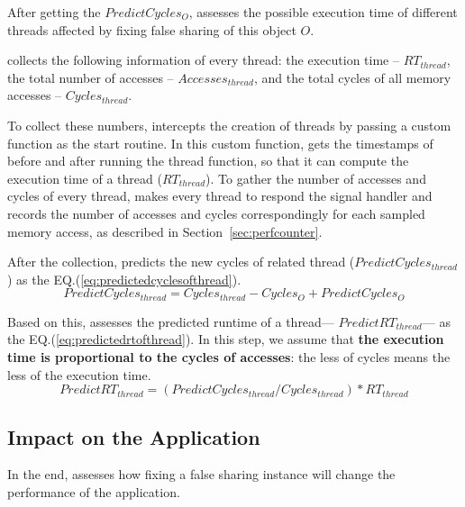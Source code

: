 After getting the $PredictCycles_{O}$, \cheetah{} assesses the possible execution time of different threads affected by fixing false sharing of this object $O$. 

\Cheetah{} collects the following information of every thread: the execution time -- $RT_{thread}$, the total number of accesses -- $Accesses_{thread}$, and the total cycles of all memory accesses -- $Cycles_{thread}$.

To collect these numbers, \cheetah{} intercepts the creation of threads by passing a custom function as the start routine. In this custom function, \cheetah{} gets the timestamps of before and after running the thread function, so that it can compute the execution time of a thread ($RT_{thread}$). To gather the number of accesses and cycles of every thread, \cheetah{} makes every thread to respond the signal handler and records the number of accesses and cycles correspondingly  for each sampled memory access, as described in Section~\ref{sec:perfcounter}. 

After the collection, \cheetah{} predicts the new cycles of related thread ($PredictCycles_{thread}$) as the EQ.(\ref{eq:predictedcyclesofthread}). 
\begin{equation}
\label{eq:predictedcyclesofthread}
 PredictCycles_{thread} = Cycles_{thread} - Cycles_{O} + PredictCycles_{O} 
\end{equation} 
 

Based on this, \cheetah{} assesses the predicted runtime of a thread--- $PredictRT_{thread}$--- as the EQ.(\ref{eq:predictedrtofthread}). In this step, we assume that {\bf the execution time is proportional to the cycles of accesses}: the less of cycles means the less of the execution time.  
\begin{equation}
\label{eq:predictedrtofthread}
 PredictRT_{thread} = (PredictCycles_{thread}/Cycles_{thread}) * RT_{thread} 
\end{equation} 

\subsection{Impact on the Application}
\label{sec:impactapp}

In the end, \cheetah{} assesses how fixing a false sharing instance will change the performance of the application. 

